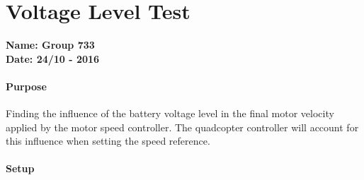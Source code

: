 \chapter{Voltage Level Test}\label{app:VoltageLevelTest} 
\textbf{Name: Group 733}\\
\textbf{Date: 24/10 - 2016}

\subsubsection{Purpose}
Finding the influence of the battery voltage level in the final motor velocity applied by the motor speed controller. The quadcopter controller will account for this influence when setting the speed reference.

\subsubsection{Setup}

